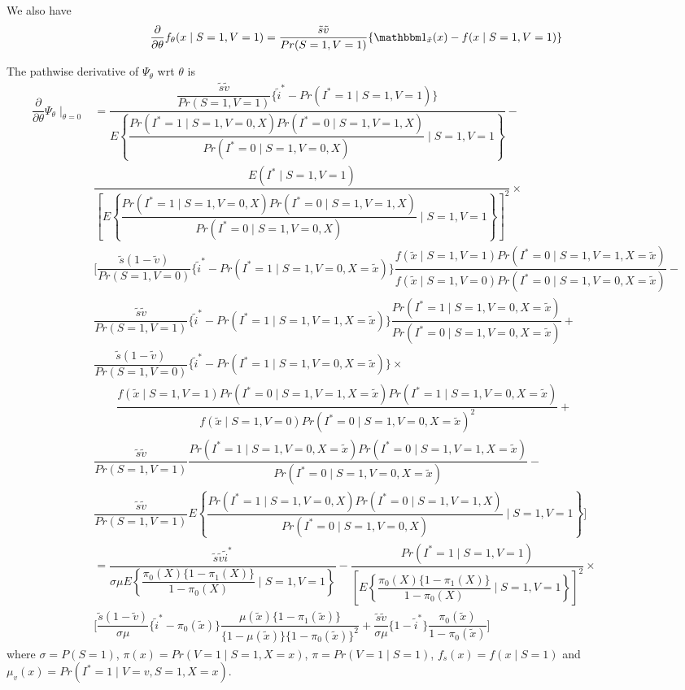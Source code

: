 \documentclass{article}
\begin{document}
We also have
$$\dfrac{\partial}{\partial\theta}f_\theta(x\mid S=1, V=1) = \dfrac{\tilde s \tilde v}{Pr(S=1, V=1)}\{\mathbbm 1_{\tilde x}(x)-f(x\mid S=1, V=1)\}$$

The pathwise derivative of $\Psi_\theta$ wrt $\theta$ is
\begin{align*}
    \dfrac{\partial}{\partial\theta}\Psi_\theta\mid_{\theta=0} &= \dfrac{\dfrac{\tilde s\tilde v}{Pr(S=1, V=1)}\{\tilde i^* - Pr(I^*=1\mid S=1, V=1)\}}{E\left\{\dfrac{Pr(I^*=1\mid S=1, V=0, X)Pr(I^*=0\mid S=1, V=1, X)}{Pr(I^*=0\mid S=1, V=0, X)}\mid S=1, V=1\right\}} -\\
    & \dfrac{E(I^*\mid S=1, V=1)}{\left[E\left\{\dfrac{Pr(I^*=1\mid S=1, V=0, X)Pr(I^*=0\mid S=1, V=1, X)}{Pr(I^*=0\mid S=1, V=0, X)}\mid S=1, V=1\right\}\right]^2}\times \\
    &\bigg[ \dfrac{\tilde s(1 - \tilde v)}{Pr(S=1, V=0)}\{\tilde i^* - Pr(I^* = 1\mid S=1, V=0, X=\tilde x)\}\dfrac{f(\tilde x\mid S=1, V=1)Pr(I^*=0\mid S=1, V=1, X=\tilde x)}{f(\tilde x\mid S=1, V=0)Pr(I^*=0\mid S=1, V=0, X=\tilde x)} -\\
    & \dfrac{\tilde s\tilde v}{Pr(S=1, V=1)}\{\tilde i^* - Pr(I^*=1\mid S=1, V=1, X=\tilde x)\}\dfrac{Pr(I^*=1\mid S=1, V=0, X=\tilde x)}{Pr(I^*=0\mid S=1, V=0, X=\tilde x)} + \\
    &\dfrac{\tilde s(1 - \tilde v)}{Pr(S=1, V=0)}\{\tilde i^* - Pr(I^* = 1\mid S=1, V=0, X=\tilde x)\}\times \\&\qquad \dfrac{f(\tilde x\mid S=1, V=1)Pr(I^*=0\mid S=1, V=1, X=\tilde x)Pr(I^*=1\mid S=1, V=0, X=\tilde x)}{f(\tilde x\mid S=1, V=0)Pr(I^*=0\mid S=1, V=0, X=\tilde x)^2}+\\
    &\dfrac{\tilde s\tilde v}{Pr(S=1, V=1)}\dfrac{Pr(I^*=1\mid S=1, V=0, X=\tilde x)Pr(I^*=0\mid S=1, V=1, X=\tilde x)}{Pr(I^*=0\mid S=1, V=0, X=\tilde x)} -\\
   & \dfrac{\tilde s\tilde v}{Pr(S=1, V=1)}E\left\{\dfrac{Pr(I^*=1\mid S=1, V=0, X)Pr(I^*=0\mid S=1, V=1, X)}{Pr(I^*=0\mid S=1, V=0, X)}\mid S=1, V=1\right\}\bigg]\\
   &= \dfrac{\tilde s\tilde v\tilde i^*}{\sigma\mu E\left\{\dfrac{\pi_0(X)\{1 - \pi_1(X)\}}{1 - \pi_0(X)}\mid S=1, V=1\right\}} - \dfrac{Pr(I^*=1\mid S=1, V=1)}{\left[E\left\{\dfrac{\pi_0(X)\{1 - \pi_1(X)\}}{1 - \pi_0(X)}\mid S=1, V=1\right\}\right]^2}\times \\
    &\bigg[ \dfrac{\tilde s(1 - \tilde v)}{\sigma\mu}\{\tilde i^* - \pi_0(\tilde x)\}\dfrac{\mu(\tilde x)\{1 - \pi_1(\tilde x)\}}{\{1 - \mu(\tilde x)\}\{1 - \pi_0(\tilde x)\}^2} + \dfrac{\tilde s\tilde v}{\sigma\mu}\{1-\tilde i^*\}\dfrac{\pi_0(\tilde x)}{1-\pi_0(\tilde x)}\bigg]
\end{align*}
where $\sigma=P(S=1)$, $\pi(x) = Pr(V=1\mid S=1, X=x)$, $\pi=Pr(V=1\mid S=1)$, $f_s(x)=f(x\mid S=1)$ and $\mu_v(x)=Pr(I^*=1\mid V=v, S=1, X=x)$.
\end{document}
